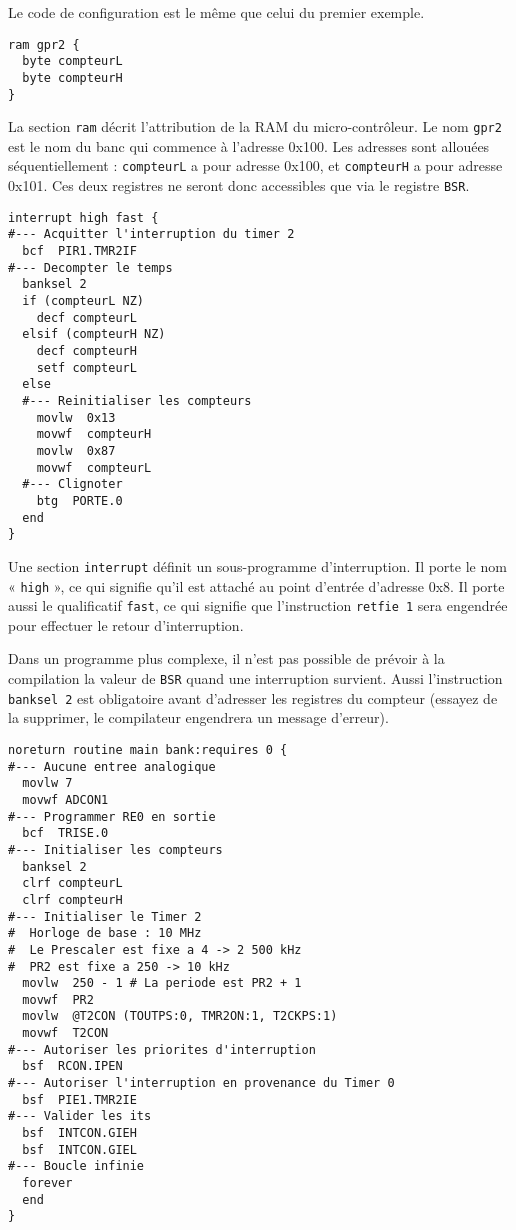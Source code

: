 Le code de configuration est le même que celui du premier exemple.


\begin{lstlisting}[language=piccolo]
ram gpr2 {
  byte compteurL
  byte compteurH
}
\end{lstlisting}
La section \texttt{ram} décrit l’attribution de la RAM du micro-contrôleur. Le nom \texttt{gpr2} est le nom du banc qui commence à l’adresse 0x100. Les adresses sont allouées séquentiellement : \texttt{compteurL} a pour adresse 0x100, et \texttt{compteurH} a pour adresse 0x101. Ces deux registres ne seront donc accessibles que via le registre \texttt{BSR}.


\begin{lstlisting}[language=piccolo]
interrupt high fast {
#--- Acquitter l'interruption du timer 2 
  bcf  PIR1.TMR2IF 
#--- Decompter le temps
  banksel 2 
  if (compteurL NZ)
    decf compteurL
  elsif (compteurH NZ)
    decf compteurH
    setf compteurL
  else
  #--- Reinitialiser les compteurs
    movlw  0x13
    movwf  compteurH
    movlw  0x87
    movwf  compteurL
  #--- Clignoter
    btg  PORTE.0
  end
}
\end{lstlisting}
Une section \texttt{interrupt} définit un sous-programme d’interruption. Il porte le nom « \texttt{high} », ce qui signifie qu’il est attaché au point d’entrée d’adresse 0x8. Il porte aussi le qualificatif \texttt{fast}, ce qui signifie que l’instruction \texttt{retfie 1} sera engendrée pour effectuer le retour d’interruption.

Dans un programme plus complexe, il n’est pas possible de prévoir à la compilation la valeur de \texttt{BSR} quand une interruption survient. Aussi l’instruction \texttt{banksel 2} est obligatoire avant d’adresser les registres du compteur (essayez de la supprimer, le compilateur engendrera un message d'erreur).

\begin{lstlisting}[language=piccolo]
noreturn routine main bank:requires 0 {
#--- Aucune entree analogique
  movlw 7
  movwf ADCON1
#--- Programmer RE0 en sortie
  bcf  TRISE.0
#--- Initialiser les compteurs
  banksel 2
  clrf compteurL
  clrf compteurH
#--- Initialiser le Timer 2
#  Horloge de base : 10 MHz
#  Le Prescaler est fixe a 4 -> 2 500 kHz
#  PR2 est fixe a 250 -> 10 kHz
  movlw  250 - 1 # La periode est PR2 + 1
  movwf  PR2
  movlw  @T2CON (TOUTPS:0, TMR2ON:1, T2CKPS:1)
  movwf  T2CON  
#--- Autoriser les priorites d'interruption
  bsf  RCON.IPEN
#--- Autoriser l'interruption en provenance du Timer 0
  bsf  PIE1.TMR2IE
#--- Valider les its
  bsf  INTCON.GIEH
  bsf  INTCON.GIEL
#--- Boucle infinie
  forever
  end
}
\end{lstlisting}

